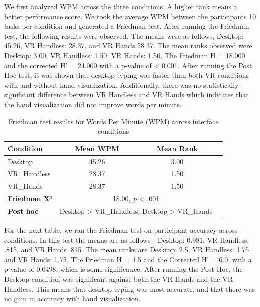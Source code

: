 \documentclass[acmlarge]{acmart}
\begin{document}
We first analyzed WPM across the three conditions. A higher rank means a better performance score. We took the average WPM between the participants 10 tasks per condition and generated a Friedman test. After running the Friedman test, the following results were observed. The means were as follows, Desktop: 45.26, VR Handless: 28.37, and VR Hands 28.37. The mean ranks observed were Desktop: 3.00, VR Handless: 1.50, VR Hands: 1.50. The Friedman H = 18.000 and the corrected H' = 24.000 with a p-value of < 0.001. After running the Post Hoc test, it was shown that desktop typing was faster than both VR conditions with and without hand visualization. Additionally, there was no statistically significant difference between VR Handless and VR Hands which indicates that the hand visualization did not improve words per minute. 

\begin{table}[H]
\centering
\caption{Friedman test results for Words Per Minute (WPM) across interface conditions}
\label{tab:wpm_friedman}
\begin{tabular}{lccc}
\toprule
\textbf{Condition} & \textbf{Mean WPM} & \textbf{Mean Rank} \\
\midrule
Desktop     & 45.26  & 3.00 \\
VR\_Handless & 28.37  & 1.50 \\
VR\_Hands    & 28.37  & 1.50 \\
\midrule
\textbf{Friedman X²} & \multicolumn{2}{c}{18.00, $p$ < .001} \\
\textbf{Post hoc} & \multicolumn{2}{c}{Desktop > VR\_Handless, Desktop > VR\_Hands} \\
\bottomrule
\end{tabular}
\end{table}

For the next table, we ran the Friedman test on participant accuracy across conditions. In this test the means are as follows - Desktop: 0.981, VR Handless: .815, and VR Hands .815. The mean ranks are Desktop: 2.5, VR Handless: 1.75, and VR Hands: 1.75. The Friedman H = 4.5 and the Corrected H' = 6.0, with a p-value of 0.0498, which is some significance. After running the Post Hoc, the Desktop condition was significant against both the VR Hands and the VR Handless. This means that desktop typing was most accurate, and that there was no gain in accuracy with hand visualization. 
\end{document}
